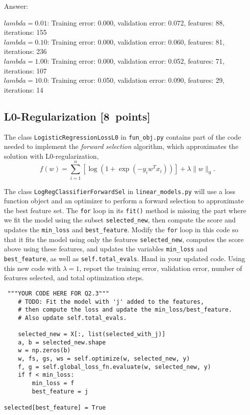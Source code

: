 \documentclass{article}
\newcommand{\blu}[1]{{\textcolor{blu}{#1}}}
\newenvironment{answer}{\par\begingroup\color{gre}Answer: }{\endgroup}
\let\ask\blu
\newcommand\pts[1]{\textcolor{pointscolour}{[#1~points]}}
\newcommand{\norm}[1]{\lVert #1 \rVert}
\begin{document}
\begin{answer}

    $lambda = 0.01$: Training error: 0.000, validation error: 0.072, features: 88, iterations: 155 \\
    $lambda = 0.10$: Training error: 0.000, validation error: 0.060, features: 81, iterations: 236 \\
    $lambda = 1.00$: Training error: 0.000, validation error: 0.052, features: 71, iterations: 107 \\
    $lambda = 10.0$: Training error: 0.050, validation error: 0.090, features: 29, iterations: 14 \\
\end{answer}

\subsection{L0-Regularization \pts{8}}

The class \verb|LogisticRegressionLossL0| in \verb|fun_obj.py| contains part of the code needed to implement the \emph{forward selection} algorithm,
which approximates the solution with L0-regularization,
\[
f(w) =  \sum_{i=1}^n \left[\log(1+\exp(-y_iw^Tx_i))\right] + \lambda\norm{w}_0.
\]

The class \verb|LogRegClassifierForwardSel| in \verb|linear_models.py| will use a loss function object and an optimizer to perform a forward selection to approximate the best feature set.
The \verb|for| loop in its \verb|fit()| method is missing the part where we fit the model using the subset \verb|selected_new|,
then compute the score and updates the \verb|min_loss| and \verb|best_feature|.
Modify the \verb|for| loop in this code so that it fits the model using only
the features \verb|selected_new|, computes the score above using these features,
and updates the variables \verb|min_loss| and \verb|best_feature|,
as well as \verb|self.total_evals|.
\ask{Hand in your updated code. Using this new code with $\lambda=1$,
report the training error, validation error, number of features selected, and total optimization steps.}

\begin{verbatim}
 """YOUR CODE HERE FOR Q2.3"""
    # TODO: Fit the model with 'j' added to the features,
    # then compute the loss and update the min_loss/best_feature.
    # Also update self.total_evals.

    selected_new = X[:, list(selected_with_j)]
    a, b = selected_new.shape
    w = np.zeros(b)
    w, fs, gs, ws = self.optimize(w, selected_new, y)
    f, g = self.global_loss_fn.evaluate(w, selected_new, y)
    if f < min_loss:
        min_loss = f
        best_feature = j
    
selected[best_feature] = True
\end{verbatim}
\end{document}
